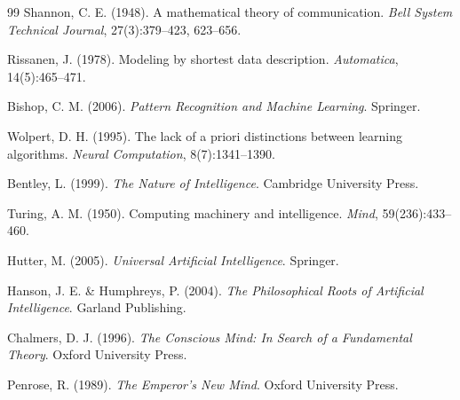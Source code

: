 \documentclass[12pt, a4paper]{article}
\begin{document}
\begin{thebibliography}{99}
 Shannon, C. E. (1948). A mathematical theory of communication. \textit{Bell System Technical Journal}, 27(3):379--423, 623--656.

 Rissanen, J. (1978). Modeling by shortest data description. \textit{Automatica}, 14(5):465--471.

 Bishop, C. M. (2006). \textit{Pattern Recognition and Machine Learning}. Springer.

 Wolpert, D. H. (1995). The lack of a priori distinctions between learning algorithms. \textit{Neural Computation}, 8(7):1341--1390.

 Bentley, L. (1999). \textit{The Nature of Intelligence}. Cambridge University Press.

 Turing, A. M. (1950). Computing machinery and intelligence. \textit{Mind}, 59(236):433--460.

 Hutter, M. (2005). \textit{Universal Artificial Intelligence}. Springer.

 Hanson, J. E. \& Humphreys, P. (2004). \textit{The Philosophical Roots of Artificial Intelligence}. Garland Publishing.

 Chalmers, D. J. (1996). \textit{The Conscious Mind: In Search of a Fundamental Theory}. Oxford University Press.

 Penrose, R. (1989). \textit{The Emperor's New Mind}. Oxford University Press.
\end{thebibliography}
\end{document}
